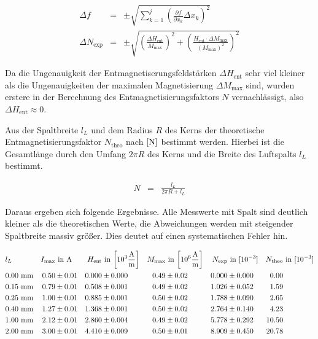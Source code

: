 \documentclass[12pt,a4paper]{scrartcl}
\numberwithin{equation}{section} %
\renewcommand{\[}{} %
\renewcommand{\]}{\noindent} %
\begin{document}
\[
\begin{eqnarray}
    \Delta f &=& \pm\sqrt{
        \sum_{k=1}^j
            \left(
                \frac{\partial f}{\partial x_k} \Delta x_k
            \right)^2
        } \\
    \Delta N_\mathrm{exp} &=&
        \pm\sqrt{
            \left(\frac{\Delta H_\mathrm{ent}}{M_\mathrm{max}}\right)^2
            + \left(\frac{H_\mathrm{ent}\cdot \Delta M_\mathrm{max}}{(M_\mathrm{max})^2}\right)^2       }
\end{eqnarray}
\]

Da die Ungenauigkeit der Entmagnetiserungsfeldstärken
\(\Delta H_\mathrm{ent}\) sehr viel kleiner als die Ungenauigkeiten der
maximalen Magnetisierung \(\Delta M_\mathrm{max}\) sind, wurden erstere
in der Berechnung des Entmagnetisierungsfaktors \(N\) vernachlässigt,
also \(\Delta H_\mathrm{ent}\approx 0\).

Aus der Spaltbreite \(l_L\) und dem Radius \(R\) des Kerns der
theoretische Entmagnetisierungsfaktor \(N_\mathrm{theo}\) nach
\(\eqref{N}\) bestimmt werden. Hierbei ist die Gesamtlänge durch den
Umfang \(2\pi R\) des Kerns und die Breite des Luftspalts \(l_L\)
bestimmt.

\[
\begin{eqnarray}
    N &=& \frac{l_L}{2\pi R + l_L} 
\end{eqnarray}
\]

Daraus ergeben sich folgende Ergebnisse. Alle Messwerte mit Spalt sind
deutlich kleiner als die theoretischen Werte, die Abweichungen werden
mit steigender Spaltbreite massiv größer. Dies deutet auf einen
systematischen Fehler hin.

\[
\begin{align*}
    &l_L &
        I_\mathrm{max} &\text{ in } \mathrm A &
        H_\mathrm{ent} &\text{ in }
            {\tiny \left[ 10^3 \frac{\mathrm A}{\mathrm m} \right] } &
        M_\mathrm{max} &\text{ in }
            {\tiny \left[ 10^6 \frac{\mathrm A}{\mathrm m} \right] } &
        N_\mathrm{exp} &\text{ in } [10^{-3}] &
        N_\mathrm{theo} &\text{ in } [10^{-3}]
        \\
    &0.00 \ \mathrm{mm} &
        0.50 &\pm 0.01 &
        0.000 &\pm 0.000 &
        0.49 &\pm 0.02 &
        0.000 &\pm 0.000 &
        0.00\\
    &0.15 \ \mathrm{mm} &
        0.79 &\pm 0.01 &
        0.508 &\pm 0.001 &
        0.49 &\pm 0.02 &
        1.026 &\pm 0.052 &
        1.59\\
    &0.25 \ \mathrm{mm} &
        1.00 &\pm 0.01 &
        0.885 &\pm 0.001 &
        0.50 &\pm 0.02 &
        1.788 &\pm 0.090 &
        2.65\\
    &0.40 \ \mathrm{mm} &
        1.27 &\pm 0.01 &
        1.368 &\pm 0.001 &
        0.50 &\pm 0.02 &
        2.764 &\pm 0.140 &
        4.23\\
    &1.00 \ \mathrm{mm} &
        2.12 &\pm 0.01 &
        2.860 &\pm 0.004 &
        0.49 &\pm 0.02 &
        5.778 &\pm 0.292 &
        10.50\\
    &2.00 \ \mathrm{mm} &
        3.00 &\pm 0.01 &
        4.410 &\pm 0.009 &
        0.50 &\pm 0.01 &
        8.909 &\pm 0.450 &
        20.78
\end{align*}
\]
\end{document}
